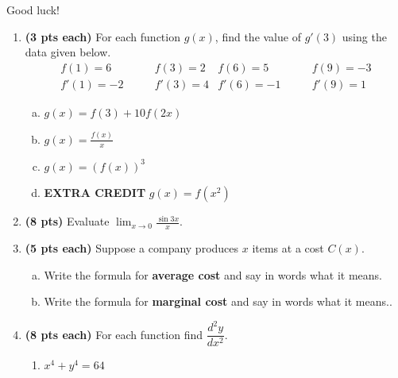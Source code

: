 \documentclass[12pt,letterpaper]{article}
\begin{document}
\begin{flushright}\Large Good luck!\end{flushright}

\begin{enumerate}[1.]
\newpage
\item {\bf (3 pts each)} For each function $g(x)$, find the value of $g'(3)$ using the data given below.
\begin{align*}
f(1)=6 & \qquad f(3)=2 & f(6)=5 & \qquad f(9)=-3\\
f'(1)=-2 & \qquad f'(3)=4 & f'(6)=-1 & \qquad f'(9)=1
\end{align*}

\vspace{1pc}
	\begin{enumerate}[(a)]
	\item $g(x)=f(3)+10f(2x)$
	
	\vspace{10pc}
	\item $g(x)=\displaystyle\frac{f(x)}{x}$
	
	\vspace{10pc}
	\item $g(x)=\left(f(x)\right)^3$
	
	\vspace{10pc}
	\item {\bf EXTRA CREDIT} $g(x)=f(x^2)$
	\end{enumerate}
	
\newpage
\item {\bf (8 pts)} Evaluate $\displaystyle\lim_{x\to 0}\frac{\sin{3x}}{x}$.

\vspace{21pc}
\item {\bf (5 pts each)} Suppose a company produces $x$ items at a cost $C(x)$.
	\begin{enumerate}[(a)]
	\item Write the formula for {\bf average cost} and say in words what it means.

	\vspace{12pc}		
	\item Write the formula for {\bf marginal cost} and say in words what it means..
	\end{enumerate}

\newpage
\item {\bf (8 pts each)} For each function find $\displaystyle\dfrac{d^2y}{dx^2}$.
	\begin{enumerate}
	\item $x^4+y^4=64$
	

\end{enumerate}
\end{enumerate}
\end{document}
